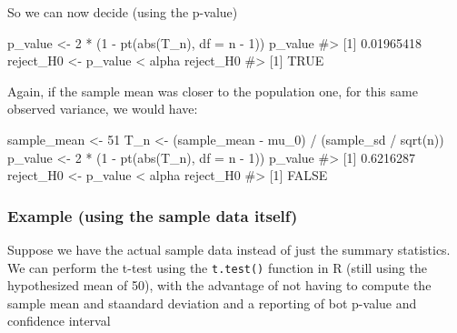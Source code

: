 \documentclass[
  letterpaper,
  DIV=11,
  numbers=noendperiod]{scrreprt}
\newenvironment{Shaded}{\begin{snugshade}}{\end{snugshade}}
\newcommand{\AttributeTok}[1]{\textcolor[rgb]{0.40,0.45,0.13}{#1}}
\newcommand{\CommentTok}[1]{\textcolor[rgb]{0.37,0.37,0.37}{#1}}
\newcommand{\DecValTok}[1]{\textcolor[rgb]{0.68,0.00,0.00}{#1}}
\newcommand{\FunctionTok}[1]{\textcolor[rgb]{0.28,0.35,0.67}{#1}}
\newcommand{\NormalTok}[1]{\textcolor[rgb]{0.00,0.23,0.31}{#1}}
\newcommand{\OtherTok}[1]{\textcolor[rgb]{0.00,0.23,0.31}{#1}}
\newcommand{\SpecialCharTok}[1]{\textcolor[rgb]{0.37,0.37,0.37}{#1}}
\begin{document}
So we can now decide (using the p-value)

\begin{Shaded}
\begin{Highlighting}[]
\NormalTok{p\_value }\OtherTok{\textless{}{-}} \DecValTok{2} \SpecialCharTok{*}\NormalTok{ (}\DecValTok{1} \SpecialCharTok{{-}} \FunctionTok{pt}\NormalTok{(}\FunctionTok{abs}\NormalTok{(T\_n), }\AttributeTok{df =}\NormalTok{ n }\SpecialCharTok{{-}} \DecValTok{1}\NormalTok{))}
\NormalTok{p\_value}
\CommentTok{\#\textgreater{} [1] 0.01965418}
\NormalTok{reject\_H0 }\OtherTok{\textless{}{-}}\NormalTok{ p\_value }\SpecialCharTok{\textless{}}\NormalTok{ alpha}
\NormalTok{reject\_H0}
\CommentTok{\#\textgreater{} [1] TRUE}
\end{Highlighting}
\end{Shaded}

Again, if the sample mean was closer to the population one, for this
same observed variance, we would have:

\begin{Shaded}
\begin{Highlighting}[]
\NormalTok{sample\_mean }\OtherTok{\textless{}{-}} \DecValTok{51}
\NormalTok{T\_n }\OtherTok{\textless{}{-}}\NormalTok{ (sample\_mean }\SpecialCharTok{{-}}\NormalTok{ mu\_0) }\SpecialCharTok{/}\NormalTok{ (sample\_sd }\SpecialCharTok{/} \FunctionTok{sqrt}\NormalTok{(n))}
\NormalTok{p\_value }\OtherTok{\textless{}{-}} \DecValTok{2} \SpecialCharTok{*}\NormalTok{ (}\DecValTok{1} \SpecialCharTok{{-}} \FunctionTok{pt}\NormalTok{(}\FunctionTok{abs}\NormalTok{(T\_n), }\AttributeTok{df =}\NormalTok{ n }\SpecialCharTok{{-}} \DecValTok{1}\NormalTok{))}
\NormalTok{p\_value}
\CommentTok{\#\textgreater{} [1] 0.6216287}
\NormalTok{reject\_H0 }\OtherTok{\textless{}{-}}\NormalTok{ p\_value }\SpecialCharTok{\textless{}}\NormalTok{ alpha}
\NormalTok{reject\_H0}
\CommentTok{\#\textgreater{} [1] FALSE}
\end{Highlighting}
\end{Shaded}

\subsubsection{Example (using the sample data
itself)}\label{example-using-the-sample-data-itself}

Suppose we have the actual sample data instead of just the summary
statistics. We can perform the t-test using the \texttt{t.test()}
function in R (still using the hypothesized mean of 50), with the
advantage of not having to compute the sample mean and staandard
deviation and a reporting of bot p-value and confidence interval
\end{document}
